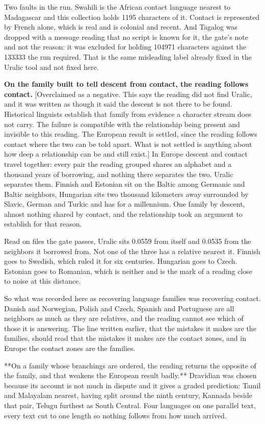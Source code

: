 Two faults in the run. Swahili is the African contact language nearest to Madagascar and this collection holds 1195 characters of it. Contact is represented by French alone, which is real and is colonial and recent. And Tagalog was dropped with a message reading that no script is known for it, the gate's note and not the reason: it was excluded for holding 104971 characters against the 133333 the run required. That is the same misleading label already fixed in the Uralic tool and not fixed here.

\textbf{On the family built to tell descent from contact, the reading follows contact.} [Overclaimed as a negative. This says the reading did not find Uralic, and it was written as though it said the descent is not there to be found. Historical linguists establish that family from evidence a character stream does not carry. The failure is compatible with the relationship being present and invisible to this reading. The European result is settled, since the reading follows contact where the two can be told apart. What is not settled is anything about how deep a relationship can be and still exist.] In Europe descent and contact travel together: every pair the reading grouped shares an alphabet and a thousand years of borrowing, and nothing there separates the two. Uralic separates them. Finnish and Estonian sit on the Baltic among Germanic and Baltic neighbors, Hungarian sits two thousand kilometers away surrounded by Slavic, German and Turkic and has for a millennium. One family by descent, almost nothing shared by contact, and the relationship took an argument to establish for that reason.

Read on files the gate passes, Uralic sits 0.0559 from itself and 0.0535 from the neighbors it borrowed from. Not one of the three has a relative nearest it. Finnish goes to Swedish, which ruled it for six centuries. Hungarian goes to Czech. Estonian goes to Romanian, which is neither and is the mark of a reading close to noise at this distance.

So what was recorded here as recovering language families was recovering contact. Danish and Norwegian, Polish and Czech, Spanish and Portuguese are all neighbors as much as they are relatives, and the reading cannot see which of those it is answering. The line written earlier, that the mistakes it makes are the families, should read that the mistakes it makes are the contact zones, and in Europe the contact zones are the families.

**On a family whose branchings are ordered, the reading returns the opposite of the family, and that weakens the European result badly.** Dravidian was chosen because its account is not much in dispute and it gives a graded prediction: Tamil and Malayalam nearest, having split around the ninth century, Kannada beside that pair, Telugu furthest as South Central. Four languages on one parallel text, every text cut to one length so nothing follows from how much arrived.


